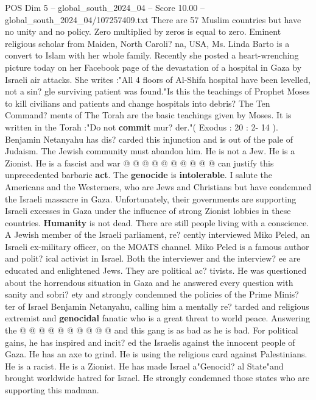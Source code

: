 \begin{textsample}{POS Dim 5 – global\_south\_2024\_04 – Score 10.00 – global\_south\_2024\_04/107257409.txt}  \label{ex:f5_pos_339}
There are 57 Muslim countries but have no unity and no policy.
Zero multiplied by zeros is equal to zero.
Eminent religious scholar from Maiden, North Caroli? na, USA, Ms.
Linda Barto is a convert to Islam with her whole family.
Recently she posted a heart-wrenching picture today on her Facebook page of the devastation of a hospital in Gaza by Israeli air attacks.
She writes :"All 4 floors of Al-Shifa hospital have been levelled, not a sin? gle surviving patient was found."Is this the teachings of Prophet Moses to kill civilians and patients and change hospitals into debris?
The Ten Command? ments of The Torah are the basic teachings given by Moses.
It is written in the Torah :"Do not \textbf{commit} mur? der."( Exodus : 20 : 2- 14 ).
Benjamin Netanyahu has dis? carded this injunction and is out of the pale of Judaism.
The Jewish community must abandon him.
He is not a Jew.
He is a Zionist.
He is a fascist and war @ @ @ @ @ @ @ @ @ @ can justify this unprecedented barbaric \textbf{act}.
The \textbf{genocide} is \textbf{intolerable}.
I salute the Americans and the Westerners, who are Jews and Christians but have condemned the Israeli massacre in Gaza.
Unfortunately, their governments are supporting Israeli excesses in Gaza under the influence of strong Zionist lobbies in these countries. \textbf{Humanity} is not dead.
There are still people living with a conscience.
A Jewish member of the Israeli parliament, re? cently interviewed Miko Peled, an Israeli ex-military officer, on the MOATS channel.
Miko Peled is a famous author and polit? ical activist in Israel.
Both the interviewer and the interview? ee are educated and enlightened Jews.
They are political ac? tivists.
He was questioned about the horrendous situation in Gaza and he answered every question with sanity and sobri? ety and strongly condemned the policies of the Prime Minis? ter of Israel Benjamin Netanyahu, calling him a mentally re? tarded and religious extremist and \textbf{genocidal} fanatic who is a great threat to world peace.
Answering the @ @ @ @ @ @ @ @ @ @ and this gang is as bad as he is bad.
For political gains, he has inspired and incit? ed the Israelis against the innocent people of Gaza.
He has an axe to grind.
He is using the religious card against Palestinians.
He is a racist.
He is a Zionist.
He has made Israel a"Genocid? al State"and brought worldwide hatred for Israel.
He strongly condemned those states who are supporting this madman.

\end{textsample}
